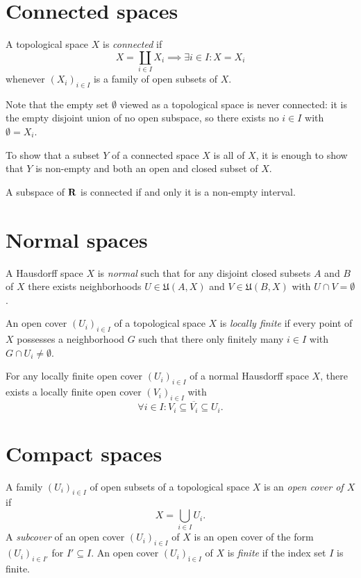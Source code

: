 \section{Connected spaces}

\begin{dfn}
  A topological space $X$ is \emph{connected} if
  \[
    X = \coprod_{i \in I} X_i \implies \exists i \in I: X = X_i
  \]
  whenever $(X_i)_{i \in I}$ is a family of open subsets of $X$.
\end{dfn}

Note that the empty set $\emptyset$ viewed as a topological space is never
connected: it is the empty disjoint union of no open subspace, so there exists
no $i \in I$ with $\emptyset = X_i$.

To show that a subset $Y$ of a connected space $X$ is all of $X$, it is enough
to show that $Y$ is non-empty and both an open and closed subset of $X$.

A subspace of $\mathbf{R}$ is connected if and only it is a non-empty interval.

\section{Normal spaces}

\begin{dfn}
  A Hausdorff space $X$ is \emph{normal} such that for any disjoint closed
  subsets $A$ and $B$ of $X$ there exists neighborhoods $U \in \mathfrak U(A, X)$
  and $V \in \mathfrak U(B, X)$ with $U \cap V = \emptyset$.
\end{dfn}

An open cover $(U_i)_{i \in I}$ of a topological space $X$ is \emph{locally finite}
if every point of $X$ possesses a neighborhood $G$ such that there only finitely
many $i \in I$ with $G \cap U_i \neq \emptyset$.
\begin{thm}
  \label{prop:shrinking_lemma}
  For any locally finite open cover $(U_i)_{i \in I}$ of a normal Hausdorff space $X$, there
  exists a locally finite open cover $(V_i)_{i \in I}$ with
  \[
    \forall i \in I : V_i \subseteq \overline{V_i} \subseteq U_i.
  \]
\end{thm}

\section{Compact spaces}
\label{sec:compact}

A family $(U_i)_{i \in I}$ of open subsets of a topological space $X$ is an
\emph{open cover of $X$} if
\[
  X = \bigcup_{i \in I} U_i.
\]
A \emph{subcover} of an open cover $(U_i)_{i \in I}$ of $X$
is an open cover of the form $(U_i)_{i \in I'}$ for $I' \subseteq I$. An open
cover $(U_i)_{í \in I}$ of $X$ is \emph{finite} if the index set $I$ is finite.

